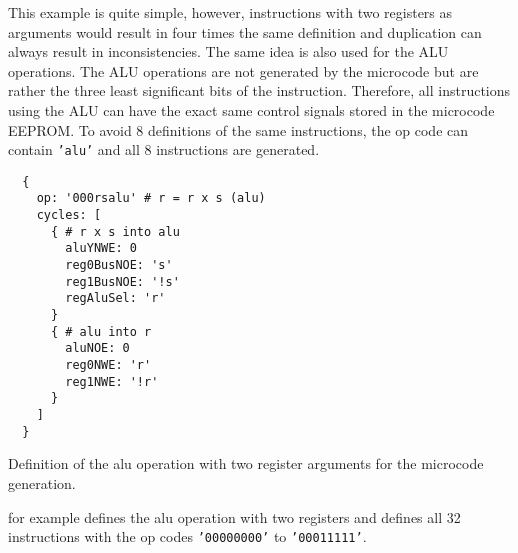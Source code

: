 This example is quite simple, however, instructions with two registers as arguments would result in four times the same definition and duplication can always result in inconsistencies.
The same idea is also used for the \gls{ALU} operations.
The \gls{ALU} operations are not generated by the microcode but are rather the three least significant bits of the instruction.
Therefore, all instructions using the \gls{ALU} can have the exact same control signals stored in the microcode \gls{EEPROM}.
To avoid 8 definitions of the same instructions, the op code can contain \texttt{'alu'} and all 8 instructions are generated.
\begin{listing}[h!]
  \begin{verbatim}
  {
    op: '000rsalu' # r = r x s (alu)
    cycles: [
      { # r x s into alu
        aluYNWE: 0
        reg0BusNOE: 's'
        reg1BusNOE: '!s'
        regAluSel: 'r'
      }
      { # alu into r
        aluNOE: 0
        reg0NWE: 'r'
        reg1NWE: '!r'
      }
    ]
  }
  \end{verbatim}
  \caption{Definition of the alu operation with two register arguments for the microcode generation.}
  \label{lst:mc_aluRS}
\end{listing}
 for example defines the alu operation with two registers and defines all 32 instructions with the op codes \texttt{'00000000'} to \texttt{'00011111'}.

